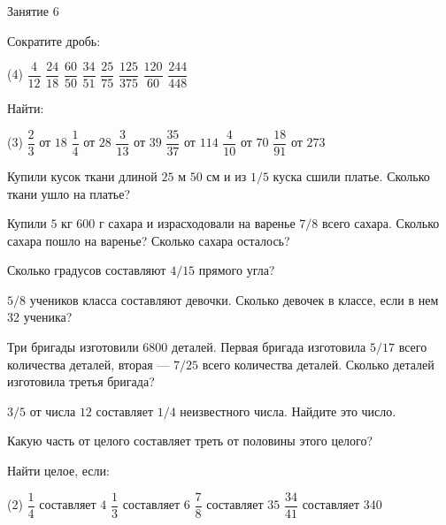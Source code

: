 \begin{class}[number=6]
	\begin{listofex}
		\item Занятие 6
	\end{listofex}
\end{class}

\begin{class}[number=7]
	\begin{listofex}
	\item Сократите дробь:
	\begin{tasks}(4)
		\task \( \dfrac{4}{12} \)
		\task \( \dfrac{24}{18} \)
		\task \( \dfrac{60}{50} \)
		\task \( \dfrac{34}{51} \)
		\task \( \dfrac{25}{75} \)
		\task \( \dfrac{125}{375} \)
		\task \( \dfrac{120}{60} \)
		\task \( \dfrac{244}{448} \)
	\end{tasks}
	\item Найти:
	\begin{tasks}(3)
		\task \( \dfrac{2}{3} \) от \( 18 \)
		\task \( \dfrac{1}{4} \) от \( 28 \)
		\task \( \dfrac{3}{13} \) от \( 39 \)
		\task \( \dfrac{35}{37} \) от \( 114 \)
		\task \( \dfrac{4}{10} \) от \( 70 \)
		\task \( \dfrac{18}{91} \) от \( 273 \)
	\end{tasks}
	\item Купили кусок ткани длиной \( 25 \) м \( 50 \) см и из \( 1/5 \) куска сшили платье. Сколько ткани ушло на платье?
	\item Купили \( 5 \) кг \( 600 \) г сахара и израсходовали на варенье \( 7/8 \) всего сахара. Сколько сахара пошло на варенье? Сколько сахара осталось?
	\item Сколько градусов составляют \( 4/15 \) прямого угла?
	\item \( 5/8 \) учеников класса составляют девочки. Сколько девочек в классе, если в нем 32
	ученика?
	\item Три бригады изготовили 6800 деталей. Первая бригада изготовила  \( 5/17 \) всего количества деталей, вторая --- \( 7/25 \) всего количества деталей. Сколько деталей изготовила третья бригада?
	\item \( 3/5 \) от числа \( 12 \) составляет \( 1/4 \) неизвестного числа. Найдите это число.
	\item Какую часть от целого составляет треть от половины этого целого?
	\item Найти целое, если:
	\begin{tasks}(2)
		\task \( \dfrac{1}{4} \) составляет \( 4 \)
		\task \( \dfrac{1}{3} \) составляет \( 6 \)
		\task \( \dfrac{7}{8} \) составляет \( 35 \)
		\task \( \dfrac{34}{41} \) составляет \( 340 \)
	\end{tasks}
	\end{listofex}
\end{class}

